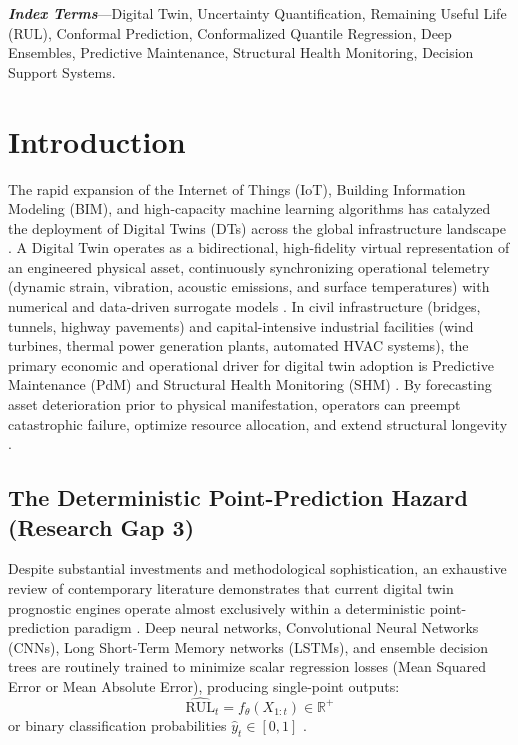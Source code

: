 \documentclass[journal,10pt,twocolumn]{article}
\begin{document}
\textbf{\textit{Index Terms}}---Digital Twin, Uncertainty Quantification, Remaining Useful Life (RUL), Conformal Prediction, Conformalized Quantile Regression, Deep Ensembles, Predictive Maintenance, Structural Health Monitoring, Decision Support Systems.

\section{Introduction}

The rapid expansion of the Internet of Things (IoT), Building Information Modeling (BIM), and high-capacity machine learning algorithms has catalyzed the deployment of Digital Twins (DTs) across the global infrastructure landscape \cite{tao2019digital, hisamuddin2026ai}. A Digital Twin operates as a bidirectional, high-fidelity virtual representation of an engineered physical asset, continuously synchronizing operational telemetry (dynamic strain, vibration, acoustic emissions, and surface temperatures) with numerical and data-driven surrogate models \cite{mousavi2024evolution, hasan2025new}. In civil infrastructure (bridges, tunnels, highway pavements) and capital-intensive industrial facilities (wind turbines, thermal power generation plants, automated HVAC systems), the primary economic and operational driver for digital twin adoption is Predictive Maintenance (PdM) and Structural Health Monitoring (SHM) \cite{huwei2024thesis, shehadeh2024economic, rezown2025ai}. By forecasting asset deterioration prior to physical manifestation, operators can preempt catastrophic failure, optimize resource allocation, and extend structural longevity \cite{brighenti2024predictive, wang2026digital}.

\subsection{The Deterministic Point-Prediction Hazard (Research Gap 3)}
Despite substantial investments and methodological sophistication, an exhaustive review of contemporary literature demonstrates that current digital twin prognostic engines operate almost exclusively within a deterministic point-prediction paradigm \cite{hosseinzadeh2023benchmarking, wang2026digital}. Deep neural networks, Convolutional Neural Networks (CNNs), Long Short-Term Memory networks (LSTMs), and ensemble decision trees are routinely trained to minimize scalar regression losses (Mean Squared Error or Mean Absolute Error), producing single-point outputs:
\begin{equation}
\widehat{\text{RUL}}_{t} = f_{\theta}(X_{1:t}) \in \mathbb{R}^+
\end{equation}
or binary classification probabilities $\hat{y}_t \in [0, 1]$ \cite{hosseinzadeh2023benchmarking, rezown2025ai}.
\end{document}
